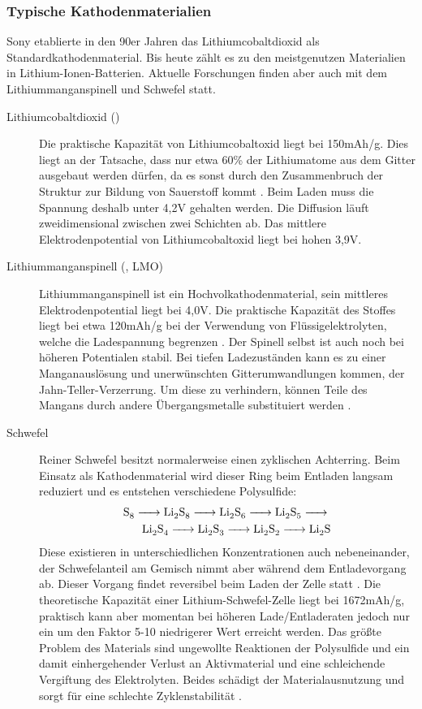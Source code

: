 \documentclass[a4paper, 11pt, headsepline,footsepline,twoside,abstract]{scrbook}
\begin{document}
\subsubsection{Typische Kathodenmaterialien}
Sony etablierte in den 90er Jahren das Lithiumcobaltdioxid als Standardkathodenmaterial. Bis heute zählt es zu den meistgenutzen Materialien in Lithium-Ionen-Batterien. Aktuelle Forschungen finden aber auch mit dem Lithiummanganspinell und Schwefel statt.
\begin{description}
\item[Lithiumcobaltdioxid ()] Die praktische Kapazität von Lithiumcobaltoxid liegt bei 150mAh/g. Dies liegt an der Tatsache, dass nur etwa 60\% der Lithiumatome aus dem Gitter ausgebaut werden dürfen, da es sonst durch den Zusammenbruch der Struktur zur Bildung von Sauerstoff kommt \cite{jossen_2006}. Beim Laden muss die Spannung deshalb unter 4,2V gehalten werden. Die Diffusion läuft zweidimensional zwischen zwei Schichten ab. Das mittlere Elektrodenpotential von Lithiumcobaltoxid liegt bei hohen 3,9V.
\item[Lithiummanganspinell (, LMO)] Lithiummanganspinell ist ein Hochvolkathodenmaterial, sein mittleres Elektrodenpotential liegt bei 4,0V. Die praktische Kapazität des Stoffes liegt bei etwa 120mAh/g bei der Verwendung von Flüssigelektrolyten, welche die Ladespannung  begrenzen \cite{Wang2008developments}. Der Spinell selbst ist auch noch bei höheren Potentialen stabil. Bei tiefen Ladezuständen kann es zu einer Manganauslösung und unerwünschten Gitterumwandlungen kommen, der Jahn-Teller-Verzerrung. Um diese zu verhindern, können Teile des Mangans durch andere Übergangsmetalle substituiert werden \cite{bhaskar20143d}.
\item[Schwefel] Reiner Schwefel besitzt normalerweise einen zyklischen Achterring. Beim Einsatz als Kathodenmaterial wird dieser Ring beim Entladen langsam reduziert und es entstehen verschiedene Polysulfide:
\begin{equation}
\begin{split}
\ce{S8 -> Li2S8 -> Li2S6 -> Li2S5 -> }\\
\ce{ Li2S4 -> Li2S3 -> Li2S2 -> Li2S}
\end{split}
\end{equation}
Diese existieren in unterschiedlichen Konzentrationen auch nebeneinander, der Schwefelanteil am Gemisch nimmt aber während dem Entladevorgang ab. Dieser Vorgang findet reversibel beim Laden der Zelle statt \cite{zhang2013liquid}. Die theoretische Kapazität einer Lithium-Schwefel-Zelle liegt bei 1672mAh/g, praktisch kann aber momentan bei höheren Lade/Entladeraten jedoch nur ein um den Faktor 5-10 niedrigerer Wert erreicht werden. Das größte Problem des Materials sind ungewollte Reaktionen der Polysulfide und ein damit einhergehender Verlust an Aktivmaterial und eine schleichende Vergiftung des Elektrolyten. Beides schädigt der Materialausnutzung und sorgt für eine schlechte Zyklenstabilität \cite{manthiram2012challenges}.
\end{description}
\end{document}
